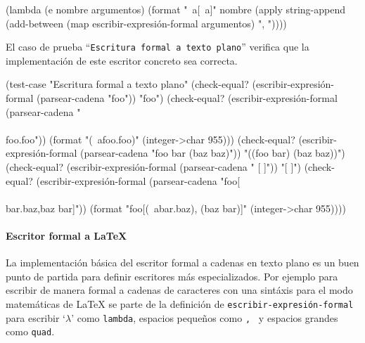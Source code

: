 \documentclass[10pt,oneside,openany,letterpaper]{book}
\begin{document}
\nwenddocs{}\endmoddef
(lambda (e nombre argumentos)
  (format "~a[~a]" nombre
          (apply string-append
                 (add-between (map escribir-expresión-formal argumentos)
                              ", "))))
\nwendcode{}\nwdocspar

El caso de prueba ``{\tt{}Escritura\ formal\ a\ texto\ plano}'' verifica que la implementación de este escritor concreto sea correcta.

\nwenddocs{}\plusendmoddef
(test-case "Escritura formal a texto plano"
  (check-equal? (escribir-expresión-formal (parsear-cadena "foo"))
                "foo")
  (check-equal? (escribir-expresión-formal (parsear-cadena "\\\\foo.foo"))
                (format "(~afoo.foo)" (integer->char 955)))
  (check-equal? (escribir-expresión-formal
                 (parsear-cadena "foo bar (baz baz)"))
                "((foo bar) (baz baz))")
  (check-equal? (escribir-expresión-formal
                 (parsear-cadena "   [       ]"))
                "[ ]")
  (check-equal? (escribir-expresión-formal
                 (parsear-cadena "foo[\\\\bar.baz,baz bar]"))
                (format "foo[(~abar.baz), (baz bar)]" (integer->char 955))))
\nwendcode{}\nwdocspar

\paragraph{Escritor formal a \LaTeX{}} La implementación básica del escritor formal a cadenas en texto plano es un buen punto de partida para definir escritores más especializados. Por ejemplo para escribir de manera formal a cadenas de caracteres con una sintáxis para el modo matemáticas de \LaTeX{} se parte de la definición de {\tt{}\protect{}escribir-expresión-formal} para escribir `\( \lambda \)' como {\tt{}{}lambda}, espacios pequeños como {\tt{}{},\ } y espacios grandes como {\tt{}{}quad}.
\end{document}
